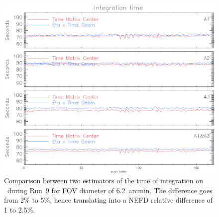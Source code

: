 \begin{figure}
\begin{center}
\includegraphics[clip, angle=0, scale =0.8]{Figures/time_of_integration_0.eps}
\caption[Time of integration]{Comparison between two estimators of the time of
  integration on \hls\ during Run~9 for FOV diameter of 6.2~arcmin. The
  difference goes from 2\% to 5\%, hence translating into a NEFD relative difference of 1
to 2.5\%.}
\label{fig:time_comparison}
\end{center}
\end{figure}



